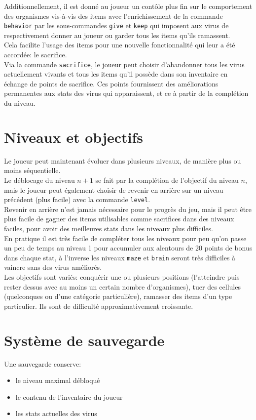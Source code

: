 \documentclass[a4paper,french]{article}
\begin{document}
Additionnellement, il est donn\'e au joueur un cont\^ole plus fin sur le comportement des organismes
vis-\`a-vis des items avec l'enrichissement de la commande \texttt{behavior} par les sous-commandes
\texttt{give} et \texttt{keep} qui imposent aux virus de respectivement donner au joueur ou garder 
tous les items qu'ils ramassent.\\
Cela facilite l'usage des items pour une nouvelle fonctionnalit\'e qui leur a \'et\'e accord\'ee: le sacrifice.\\
Via la commande \texttt{sacrifice}, le joueur peut choisir d'abandonner tous les virus actuellement vivants et tous
les items qu'il poss\`ede dans son inventaire en \'echange de points de sacrifice. Ces points fournissent des am\'eliorations
permanentes aux stats des virus qui apparaissent, et ce \`a partir de la compl\'etion du niveau.

\section{Niveaux et objectifs}
Le joueur peut maintenant \'evoluer dans plusieurs niveaux, de mani\`ere plus ou moins s\'equentielle.\\
Le d\'eblocage du niveau \(n+1\) se fait par la compl\'etion de l'objectif du niveau \(n\), mais le joueur peut \'egalement
choisir de revenir en arri\`ere sur un niveau pr\'ec\'edent (plus facile) avec la commande \texttt{level}.\\
Revenir en arri\`ere n'est jamais n\'ecessaire pour le progr\`es du jeu, mais il peut \^etre plus facile de gagner des items
utilisables comme sacrifices dans des niveaux faciles, pour avoir des meilleures stats dans les niveaux plus difficiles.\\
En pratique il est tr\`es facile de compl\'eter tous les niveaux pour peu qu'on passe un peu de temps au niveau 1 pour
accumuler aux alentours de 20 points de bonus dans chaque stat, \`a l'inverse les niveaux \texttt{maze} et \texttt{brain} seront
tr\`es difficiles \`a vaincre sans des virus am\'elior\'es.\\

Les objectifs sont vari\'es: conqu\'erir une ou plusieurs positions (l'atteindre puis rester dessus avec au moins un certain nombre d'organismes),
tuer des cellules (quelconques ou d'une cat\'egorie particuli\`ere), ramasser des items d'un type particulier.
Ils sont de difficult\'e approximativement croissante.\\

\section{Syst\`eme de sauvegarde}
Une sauvegarde conserve:
\begin{itemize}
    \item le niveau maximal d\'ebloqu\'e
    \item le contenu de l'inventaire du joueur
    \item les stats actuelles des virus
\end{itemize}
\end{document}
